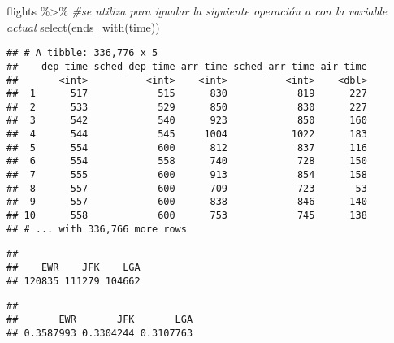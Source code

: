 \documentclass[
]{article}
\newenvironment{Shaded}{\begin{snugshade}}{\end{snugshade}}
\newcommand{\CommentTok}[1]{\textcolor[rgb]{0.56,0.35,0.01}{\textit{#1}}}
\newcommand{\FunctionTok}[1]{\textcolor[rgb]{0.00,0.00,0.00}{#1}}
\newcommand{\NormalTok}[1]{#1}
\newcommand{\OtherTok}[1]{\textcolor[rgb]{0.56,0.35,0.01}{#1}}
\newcommand{\SpecialCharTok}[1]{\textcolor[rgb]{0.00,0.00,0.00}{#1}}
\newcommand{\StringTok}[1]{\textcolor[rgb]{0.31,0.60,0.02}{#1}}
\begin{document}
\begin{Shaded}
\begin{Highlighting}[]
\NormalTok{  flights }\SpecialCharTok{\%\textgreater{}\%} \CommentTok{\#se utiliza para igualar la siguiente operación a con la variable actual}
      \FunctionTok{select}\NormalTok{(}\FunctionTok{ends\_with}\NormalTok{(}\StringTok{\textquotesingle{}time\textquotesingle{}}\NormalTok{))}
\end{Highlighting}
\end{Shaded}

\begin{verbatim}
## # A tibble: 336,776 x 5
##    dep_time sched_dep_time arr_time sched_arr_time air_time
##       <int>          <int>    <int>          <int>    <dbl>
##  1      517            515      830            819      227
##  2      533            529      850            830      227
##  3      542            540      923            850      160
##  4      544            545     1004           1022      183
##  5      554            600      812            837      116
##  6      554            558      740            728      150
##  7      555            600      913            854      158
##  8      557            600      709            723       53
##  9      557            600      838            846      140
## 10      558            600      753            745      138
## # ... with 336,766 more rows
\end{verbatim}

\begin{Shaded}
\end{Shaded}

\begin{verbatim}
## 
##    EWR    JFK    LGA 
## 120835 111279 104662
\end{verbatim}

\begin{Shaded}
\end{Shaded}

\begin{verbatim}
## 
##       EWR       JFK       LGA 
## 0.3587993 0.3304244 0.3107763
\end{verbatim}
\end{document}
